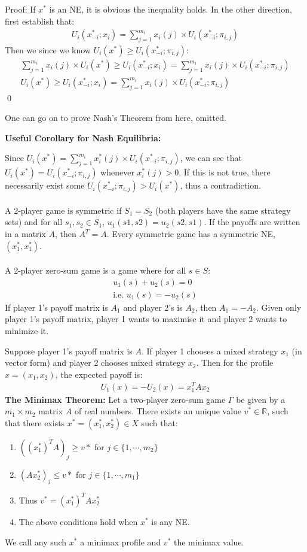 \documentclass{article}
\begin{document}
Proof: If $x^*$ is an NE, it is obvious the inequality holds. In the other direction, first establish that:
\begin{align*}
U_i(x^*_{-i}; x_i) = \sum_{j=1}^{m_i} x_i(j) \times U_i(x^*_{-i}; \pi_{i,j})
\end{align*}
Then we since we know $U_i(x^*)\ge U_i(x^*_{-i}; \pi_{i, j})$:
\begin{align*}
\sum_{j=1}^{m_i} x_i(j) \times U_i(x^*) \ge	U_i(x^*_{-i}; x_i) = \sum_{j=1}^{m_i} x_i(j) \times U_i(x^*_{-i}; \pi_{i,j}) \\
U_i(x^*) \ge	U_i(x^*_{-i}; x_i) = \sum_{j=1}^{m_i} x_i(j) \times U_i(x^*_{-i}; \pi_{i,j})
\end{align*}
\qed

One can go on to prove Nash's Theorem from here, omitted. 

\textbf{Useful Corollary for Nash Equilibria: }

Since $U_i(x^*) = \sum_{j=1}^{m_i} x^*_i(j) \times U_i(x^*_{-i}; \pi_{i,j})$, we can see that $U_i(x^*) =U_i(x^*_{-i}; \pi_{i,j})$ whenever $x^*_i(j) > 0$. If this is not true, there necessarily exist some $U_i(x^*_{-i}; \pi_{i,j}) > U_i(x^*)$, thus a contradiction.
\\~\\
A 2-player game is symmetric if $S_1 = S_2$ (both players have the same strategy sets) and for all $s_1, s_2 \in S_1$, $u_1(s1, s2) = u_2(s2, s1)$. If the payoffs are written in a matrix $A$, then $A^T = A$. Every symmetric game has a symmetric NE, $(x^*_1,x^*_1)$.
\\~\\
A 2-player zero-sum game is a game where for all $s\in S$:
\begin{align*}
u_1(s) + u_2(s) = 0\\
\text{i.e. } u_1(s) = -u_2(s)
\end{align*}
If player 1's payoff matrix is $A_1$ and player 2's is $A_2$, then $A_1 = -A_2$. Given only player 1's payoff matrix, player 1 wants to maximise it and player 2 wants to minimize it.

Suppose player 1's payoff matrix is $A$. If player 1 chooses a mixed strategy $x_1$ (in vector form) and player 2 chooses mixed strategy $x_2$. Then for the profile $x = (x_1, x_2)$, the expected payoff is:
\begin{align*}
U_1(x) = -U_2(x) = x_1^TAx_2 
\end{align*} 
\newpage
\textbf{The Minimax Theorem: } Let a two-player zero-sum game $\Gamma$ be given by a $m_1\times m_2$ matrix $A$ of real numbers. There exists an unique value $v^* \in \mathbb{R}$, such that there exists $x^* = (x^*_1, x^*_2) \in X$ such that:
\begin{enumerate}
\item $((x^*_1)^TA)_j \ge v*$ for $j \in \{1, \cdots, m_2\}$
\item $(Ax^*_2)_j \le v*$ for $j \in \{1, \cdots, m_1\}$
\item Thus $v^* = (x^*_1)^TAx^*_2$
\item The above conditions hold when $x^*$ is any NE. 
\end{enumerate} 
We call any such $x^*$ a minimax profile and $v^*$ the minimax value.
\end{document}
